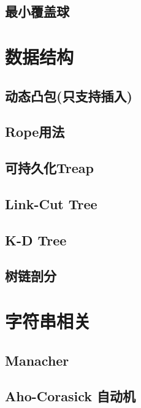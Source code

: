 \documentclass[10pt]{article}
\begin{document}
	\subsection{最小覆盖球}
		

\section{数据结构}
	\subsection{动态凸包(只支持插入)}
		
		
	\subsection{Rope用法}
		
	
	\subsection{可持久化Treap}
		
	
	\subsection{Link-Cut Tree}
		

	\subsection{K-D Tree}
		

	\subsection{树链剖分}
		

\section{字符串相关}
	\subsection{Manacher}
		

		\subsection{Aho-Corasick 自动机}
		
\end{document}
